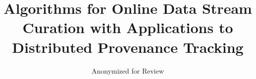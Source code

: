 \title{ Algorithms for Online Data Stream Curation with Applications to Distributed Provenance Tracking  }
\author{
    Anonymized for Review
}
\date{}

\newcommand{\affil}[1]{\textsuperscript{#1}}

\maketitle



